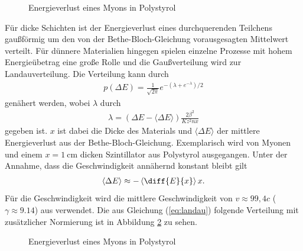\begin{figure}[h]
  \centering
  \caption{Energieverlust eines Myons in Polystyrol}
  \label{fig:bethe}
\end{figure}
Für dicke Schichten ist der Energieverlust eines durchquerenden Teilchens gaußförmig um den von der Bethe-Bloch-Gleichung vorausgesagten Mittelwert verteilt. Für dünnere Materialien hingegen spielen einzelne Prozesse mit hohem Energieübetrag eine große Rolle und die Gaußverteilung wird zur Landauverteilung. Die Verteilung kann durch
\begin{align}
  p(\Delta E)=\frac{1}{\sqrt{2\pi}}e^{-(\lambda+e^{-\lambda})/2}
  \label{eq:landau}
\end{align}
genähert werden, wobei $\lambda$ durch
\begin{align*}
  \lambda=(\Delta E-\langle \Delta E \rangle)\frac{2 \beta^2}{Kz^2nx}
\end{align*}
gegeben ist\cite{ketzer:vorlesung}. $x$ ist dabei die Dicke des Materials und $\langle \Delta E \rangle$ der mittlere Energieverlust aus der Bethe-Bloch-Gleichung. Exemplarisch wird von Myonen und einem $x=\SI{1}{\cm}$ dicken Szintillator aus Polystyrol ausgegangen. Unter der Annahme, dass die Geschwindigkeit annähernd konstant bleibt gilt
\begin{align*}
  \langle \Delta E \rangle \approx -\left\langle  \diff{E}{x}  \right\rangle x. 
\end{align*}
Für die Geschwindigkeit wird die mittlere Geschwindigkeit von $v\approx 99,4 c$ ($\gamma \approx 9.14$) aus \cite{speed} verwendet. Die aus Gleichung (\ref{eq:landau}) folgende Verteilung mit zusätzlicher Normierung ist in Abbildung \ref{fig:landau} zu sehen.

\begin{figure}[h]
  \centering
  \caption{Energieverlust eines Myons in Polystyrol}
  \label{fig:landau}
\end{figure}

